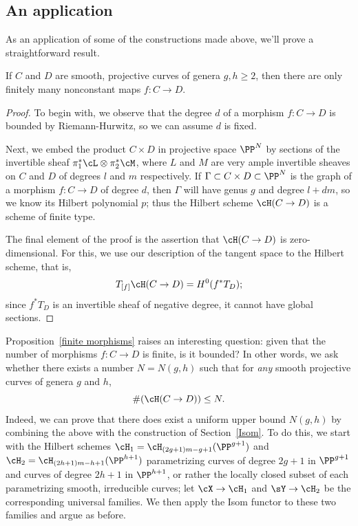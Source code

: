  \subsection{An application}
 
 As an application of some of the constructions made above, we'll prove a straightforward result.
 
 \begin{proposition}\label{finite morphisms}
 If $C$ and $D$ are smooth, projective curves of genera $g, h \geq 2$, then there are only finitely many nonconstant maps $f : C \to D$.
 \end{proposition}
 
 \begin{proof}
 To begin with, we observe that the degree $d$ of a morphism $f : C \to D$ is bounded by Riemann-Hurwitz, so we can assume $d$ is fixed.
 
 Next, we embed the product $C \times D$ in projective space $\PP^N$ by sections of the invertible sheaf $\pi_1^* \cL \otimes \pi_2^* \cM$, where $L$ and $M$ are very ample invertible sheaves on $C$ and $D$ of degrees $l$ and $m$ respectively. If $\Gamma \subset C \times D \subset \PP^N$ is the graph of a morphism $f : C \to D$ of degree $d$, then $\Gamma$ will have genus $g$ and degree $l + dm$, so we know its Hilbert polynomial $p$; thus the Hilbert scheme $\cH(C \to D)$ is a scheme of finite type.
 
 The final element of the proof is the assertion that $\cH(C \to D)$ is zero-dimensional. For this, we use our description of the tangent space to the Hilbert scheme, that is,
 $$
 T_{[f]}\cH(C \to D) = H^0(f^*T_D);
 $$
 since $f^*T_D$ is an invertible sheaf of negative degree, it cannot have global sections. 
 \end{proof}
 
 Proposition~\ref{finite morphisms} raises an interesting question: given that the number of morphisms $f : C \to D$ is finite, is it bounded? In other words, we ask whether there exists a number $N = N(g,h)$ such that for \emph{any} smooth projective curves of genera $g$ and $h$,
 $$
\# (\cH(C \to D)) \leq N.
 $$
Indeed, we can prove that there does exist a uniform upper bound $N(g,h)$ by combining the above with the construction of Section~\ref{Isom}. To do this, we start with the Hilbert schemes $\cH_1 = \cH_{(2g+1)m -g + 1}(\PP^{g+1})$ and $\cH_2 = \cH_{(2h+1)m -h + 1}(\PP^{h+1})$ parametrizing curves of degree $2g+1$ in $\PP^{g+1}$ and curves of degree $2h+1$ in $\PP^{h+1}$, or rather the locally closed subset of each parametrizing smooth, irreducible curves; let $\cX \to \cH_1$ and $\sY \to \cH_2$ be the corresponding universal families. We then apply the Isom functor to these two families and argue as before.

